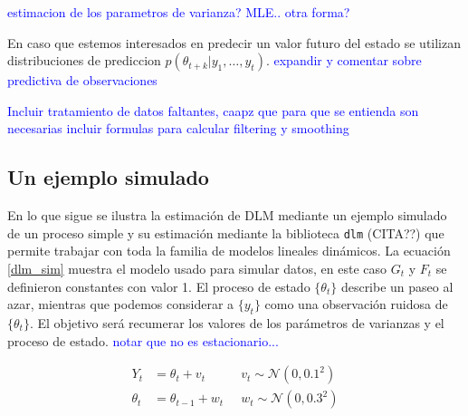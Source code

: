 \documentclass[12pt]{article}\usepackage[]{graphicx}\usepackage[]{color}
\begin{document}
\textcolor{blue}{estimacion de los parametros de varianza? MLE.. otra forma?}

En caso que estemos interesados en predecir un valor futuro del estado se utilizan distribuciones de prediccion $p(\theta_{t+k} | y_1, \ldots, y_t)$. \textcolor{blue}{expandir y comentar sobre predictiva de observaciones}

\textcolor{blue}{Incluir tratamiento de datos faltantes, caapz que para que se entienda son necesarias incluir formulas para calcular filtering y smoothing}

 
\subsection{Un ejemplo simulado \label{implementacionR} }
En lo que sigue se ilustra la estimación de DLM mediante un ejemplo simulado de un proceso simple y su estimación mediante la biblioteca \verb|dlm| (CITA??) que permite trabajar con toda la familia de modelos lineales dinámicos. La ecuación \eqref{dlm_sim} muestra el modelo usado para simular datos,  en este caso $G_t$ y $F_t$ se definieron constantes con valor 1. El proceso de estado $\{\theta_t\}$ describe un paseo al azar, mientras que podemos considerar a $\{y_t\}$ como una observación ruidosa de $\{\theta_t\}$. El objetivo será recumerar los valores de los parámetros de varianzas y el proceso de estado. \textcolor{blue}{notar que no es estacionario...}

\begin{equation}
\begin{aligned}
Y_t&=\theta_t + v_t  \;&\;  v_t \sim \mathcal{N}(0,0.1^2) \\
\theta_t &= \theta_{t-1} + w_t \;&\; w_t \sim \mathcal{N}(0,0.3^2)
\end{aligned}
\label{dlm_sim}
\end{equation}
 
\end{document}
